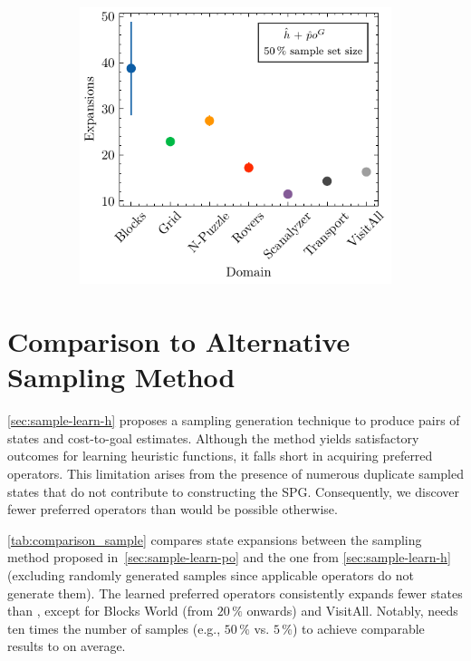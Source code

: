 \documentclass[ppgc,diss,english]{iiufrgs}
\begin{document}
\begin{figure}[tb]
  \vspace{0.5cm}

  \begin{subfigure}{0.41\textwidth}
    \centering
    \includegraphics[width=\linewidth]{img/error_hNN_poG_50pct.pdf}
  \end{subfigure}
  \label{fig:errors}
\end{figure}


\section{Comparison to Alternative Sampling Method}
\label{sec:exp-comparison-sample-method}
\cref{sec:sample-learn-h} proposes a sampling generation technique to produce pairs of states and cost-to-goal estimates. Although the method yields satisfactory outcomes for learning heuristic functions, it falls short in acquiring preferred operators.
This limitation arises from the presence of numerous duplicate sampled states that do not contribute to constructing the SPG. Consequently, we discover fewer preferred operators than would be possible otherwise.

\cref{tab:comparison_sample} compares state expansions between the sampling method proposed in~\cref{sec:sample-learn-po} \pog and the one from \cref{sec:sample-learn-h} \pofsm (excluding randomly generated samples since applicable operators do not generate them). The learned preferred operators \pog consistently expands fewer states than \pofsm, except for Blocks World (from $20\,\%$ onwards) and VisitAll. Notably, \pofsm needs ten times the number of samples (e.g., $50\,\%$ vs. $5\,\%$) to achieve comparable results to \pog on average.
\end{document}
